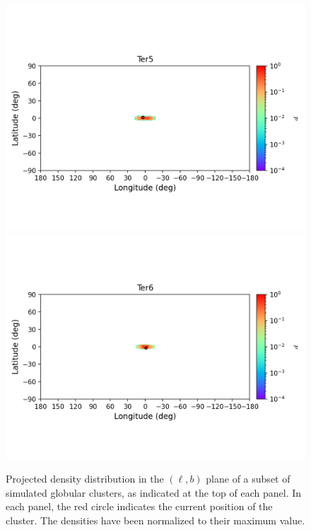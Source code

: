 \begin{figure}
\begin{center}
                \includegraphics[clip=true, trim = 0mm 20mm 0mm 10mm, width=1\columnwidth]{images/error_plots_Ter5.png}
                \includegraphics[clip=true, trim = 0mm 20mm 0mm 10mm, width=1\columnwidth]{images/error_plots_Ter6.png}
            \end{center}
            \caption[]{Projected density distribution in the $(\ell, b)$ plane of a subset of simulated globular clusters, as indicated at the top of each panel. In each panel, the red circle indicates the current position of the cluster. The densities have been normalized to their maximum value.}\label{stream19}
        \end{figure}
        
